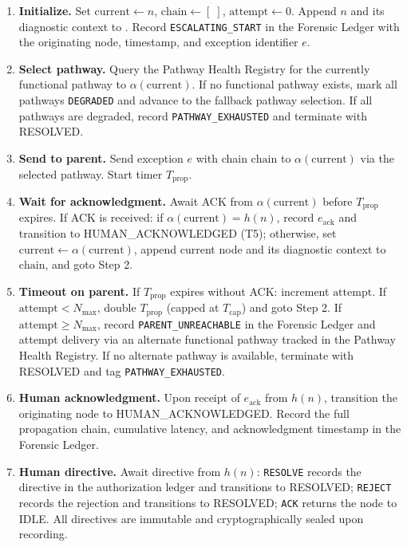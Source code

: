 \begin{enumerate}
    \item \textbf{Initialize.} Set $\text{current} \leftarrow n$, $\text{chain} \leftarrow [\;]$, $\text{attempt} \leftarrow 0$. Append $n$ and its diagnostic context to . Record \texttt{ESCALATING\_START} in the Forensic Ledger with the originating node, timestamp, and exception identifier $e$.

    \item \textbf{Select pathway.} Query the Pathway Health Registry for the currently functional pathway to $\alpha(\text{current})$. If no functional pathway exists, mark all pathways \texttt{DEGRADED} and advance to the fallback pathway selection. If all pathways are degraded, record \texttt{PATHWAY\_EXHAUSTED} and terminate with RESOLVED.

    \item \textbf{Send to parent.} Send exception $e$ with chain $\text{chain}$ to $\alpha(\text{current})$ via the selected pathway. Start timer $T_{\text{prop}}$.

    \item \textbf{Wait for acknowledgment.} Await ACK from $\alpha(\text{current})$ before $T_{\text{prop}}$ expires. If ACK is received: if $\alpha(\text{current}) = h(n)$, record $e_{\text{ack}}$ and transition to HUMAN\_ACKNOWLEDGED (T5); otherwise, set $\text{current} \leftarrow \alpha(\text{current})$, append current node and its diagnostic context to $\text{chain}$, and goto Step 2.

    \item \textbf{Timeout on parent.} If $T_{\text{prop}}$ expires without ACK: increment $\text{attempt}$. If $\text{attempt} < N_{\max}$, double $T_{\text{prop}}$ (capped at $T_{\text{cap}}$) and goto Step 2. If $\text{attempt} \geq N_{\max}$, record \texttt{PARENT\_UNREACHABLE} in the Forensic Ledger and attempt delivery via an alternate functional pathway tracked in the Pathway Health Registry. If no alternate pathway is available, terminate with RESOLVED and tag \texttt{PATHWAY\_EXHAUSTED}.

    \item \textbf{Human acknowledgment.} Upon receipt of $e_{\text{ack}}$ from $h(n)$, transition the originating node to HUMAN\_ACKNOWLEDGED. Record the full propagation chain, cumulative latency, and acknowledgment timestamp in the Forensic Ledger.

    \item \textbf{Human directive.} Await directive from $h(n)$: \texttt{RESOLVE} records the directive in the authorization ledger and transitions to RESOLVED; \texttt{REJECT} records the rejection and transitions to RESOLVED; \texttt{ACK} returns the node to IDLE. All directives are immutable and cryptographically sealed upon recording.
\end{enumerate}

